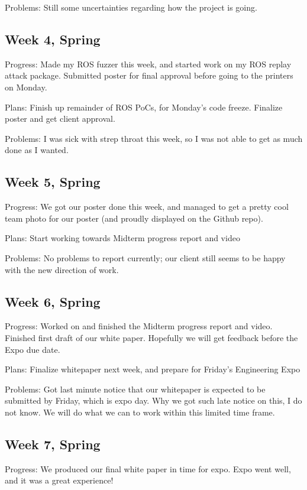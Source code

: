 \documentclass[IEEEtran,letterpaper,10pt,notitlepage,draftclsnofoot,onecolumn]{article}
\begin{document}
                            Problems: Still some uncertainties regarding how the project is going.
                            \subsection{Week 4, Spring}
                            Progress: Made my ROS fuzzer this week, and started work on my ROS replay attack package. Submitted poster for final approval before going to the printers on Monday.

                            Plans: Finish up remainder of ROS PoCs, for Monday's code freeze. Finalize poster and get client approval.

                            Problems: I was sick with strep throat this week, so I was not able to get as much done as I wanted.
                            \subsection{Week 5, Spring}
                            Progress: We got our poster done this week, and managed to get a pretty cool team photo for our poster (and proudly displayed on the Github repo).

                            Plans: Start working towards Midterm progress report and video

                            Problems: No problems to report currently; our client still seems to be happy with the new direction of work.
                            \subsection{Week 6, Spring}
                            Progress: Worked on and finished the Midterm progress report and video. Finished first draft of our white paper. Hopefully we will get feedback before the Expo due date.

                            Plans: Finalize whitepaper next week, and prepare for Friday's Engineering Expo

                            Problems: Got last minute notice that our whitepaper is expected to be submitted by Friday, which is expo day. Why we got such late notice on this, I do not know. We will do what we can to work within this limited time frame.
                            \subsection{Week 7, Spring}
                            Progress: We produced our final white paper in time for expo. Expo went well, and it was a great experience!
\end{document}
